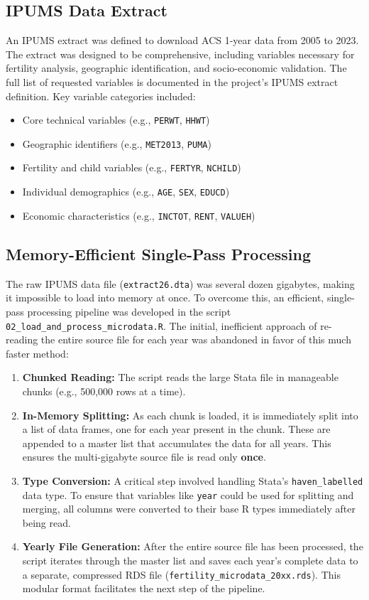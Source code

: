 \documentclass{article}
\begin{document}
\subsection{IPUMS Data Extract}
An IPUMS extract was defined to download ACS 1-year data from 2005 to 2023. The extract was designed to be comprehensive, including variables necessary for fertility analysis, geographic identification, and socio-economic validation. The full list of requested variables is documented in the project's IPUMS extract definition. Key variable categories included:
\begin{itemize}
    \item Core technical variables (e.g., \texttt{PERWT}, \texttt{HHWT})
    \item Geographic identifiers (e.g., \texttt{MET2013}, \texttt{PUMA})
    \item Fertility and child variables (e.g., \texttt{FERTYR}, \texttt{NCHILD})
    \item Individual demographics (e.g., \texttt{AGE}, \texttt{SEX}, \texttt{EDUCD})
    \item Economic characteristics (e.g., \texttt{INCTOT}, \texttt{RENT}, \texttt{VALUEH})
\end{itemize}

\subsection{Memory-Efficient Single-Pass Processing}
The raw IPUMS data file (\texttt{extract26.dta}) was several dozen gigabytes, making it impossible to load into memory at once. To overcome this, an efficient, single-pass processing pipeline was developed in the script \texttt{02\_load\_and\_process\_microdata.R}. The initial, inefficient approach of re-reading the entire source file for each year was abandoned in favor of this much faster method:
\begin{enumerate}
    \item \textbf{Chunked Reading:} The script reads the large Stata file in manageable chunks (e.g., 500,000 rows at a time).
    \item \textbf{In-Memory Splitting:} As each chunk is loaded, it is immediately split into a list of data frames, one for each year present in the chunk. These are appended to a master list that accumulates the data for all years. This ensures the multi-gigabyte source file is read only \textbf{once}.
    \item \textbf{Type Conversion:} A critical step involved handling Stata's \texttt{haven\_labelled} data type. To ensure that variables like \texttt{year} could be used for splitting and merging, all columns were converted to their base R types immediately after being read.
    \item \textbf{Yearly File Generation:} After the entire source file has been processed, the script iterates through the master list and saves each year's complete data to a separate, compressed RDS file (\texttt{fertility\_microdata\_20xx.rds}). This modular format facilitates the next step of the pipeline.
\end{enumerate}
\end{document}
